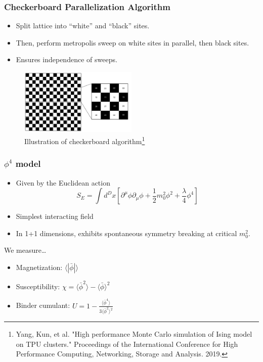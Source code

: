 \documentclass{beamer}
\begin{document}
\begin{frame}
    \frametitle{Checkerboard Parallelization Algorithm}
    \begin{itemize}
        \item Split lattice into ``white'' and ``black'' sites. 
        \item Then, perform metropolis sweep on white sites in parallel, then black sites.
        \item Ensures independence of sweeps.
\end{itemize}

    \begin{figure}[h]

      \centering
          \includegraphics[width=0.5\textwidth]{imgs/checkerboard}
          \caption{Illustration of checkerboard algorithm\footnote{Yang, Kun, et al. "High performance Monte Carlo simulation of Ising model on TPU clusters." Proceedings of the International Conference for High Performance Computing, Networking, Storage and Analysis. 2019.}}
    \end{figure}

\end{frame}


\begin{frame}
    \frametitle{$\phi^4$ model}
    \begin{itemize}
        \item Given by the Euclidean action
            \begin{equation}
                S_E = \int d^D x \left[ \partial^\mu \phi \partial_\mu\phi + \frac{1}{2} m_0^2 \phi^2 + \frac{\lambda}{4}\phi^4\right]
            \end{equation} 

        \item Simplest interacting field
        \item In 1+1 dimensions, exhibits spontaneous symmetry breaking at critical $m_0^2$.


    \end{itemize}

    We measure\ldots
\begin{itemize}
    \item Magnetization: $\langle |\bar\phi|\rangle$
    \item Susceptibility: $\chi = \langle {\bar\phi}^2\rangle - \langle\bar\phi\rangle^2$
    \item Binder cumulant: $U = 1 - \frac{\langle {\bar\phi}^4\rangle}{3 \langle {\bar\phi}^2\rangle^2}$
\end{itemize}
\end{frame}
\end{document}
